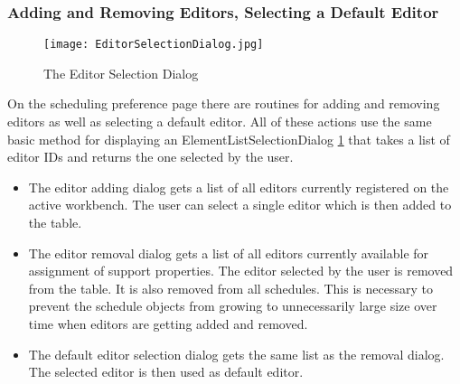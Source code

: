 \subsubsection{Adding and Removing Editors, Selecting a Default Editor}
\begin{figure}
  \centering
  \texttt{[image: EditorSelectionDialog.jpg]}
  \caption[Editor Selection Dialog]%
  {The Editor Selection Dialog\protect}
  \label{fig:EditorSelectionDialog}
\end{figure}
On the scheduling preference page there are routines for adding and removing
editors as well as selecting a default editor.
All of these actions use the same basic method for displaying an ElementListSelectionDialog \ref{fig:EditorSelectionDialog}
that takes a list of editor IDs and returns the one selected by the user.
\begin{itemize}
 \item The editor adding dialog gets a list of all editors currently registered on the
 active workbench. The user can select a single editor which is then added to the table.
 \item The editor removal dialog gets a list of all editors currently available for 
 assignment of support properties. The editor selected by the user is removed from the table.
 It is also removed from all schedules. This is necessary to prevent the schedule objects from growing
 to unnecessarily large size over time when editors are getting added and removed.
 \item The default editor selection dialog gets the same list as the removal dialog. The selected
 editor is then used as default editor. 
\end{itemize}


